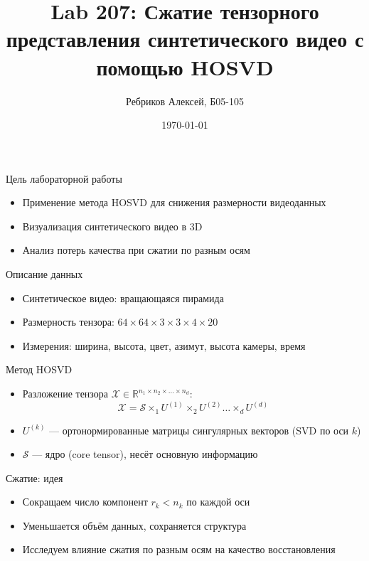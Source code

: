 \documentclass{beamer}
\title{Lab 207: Сжатие тензорного представления синтетического видео с помощью HOSVD}
\author{Ребриков Алексей, Б05-105}
\date{\today}
\begin{document}
\frame{\titlepage}

\begin{frame}{Цель лабораторной работы}
\begin{itemize}
  \item Применение метода HOSVD для снижения размерности видеоданных
  \item Визуализация синтетического видео в 3D
  \item Анализ потерь качества при сжатии по разным осям
\end{itemize}
\end{frame}

\begin{frame}{Описание данных}
\begin{itemize}
  \item Синтетическое видео: вращающаяся пирамида
  \item Размерность тензора: $64 \times 64 \times 3 \times 3 \times 4 \times 20$
  \item Измерения: ширина, высота, цвет, азимут, высота камеры, время
\end{itemize}
\end{frame}

\begin{frame}{Метод HOSVD}
\begin{itemize}
  \item Разложение тензора $\mathcal{X} \in \mathbb{R}^{n_1 \times n_2 \times \dots \times n_d}$:
  \begin{equation*}
    \mathcal{X} = \mathcal{S} \times_1 U^{(1)} \times_2 U^{(2)} \dots \times_d U^{(d)}
  \end{equation*}
  \item $U^{(k)}$ — ортонормированные матрицы сингулярных векторов (SVD по оси $k$)
  \item $\mathcal{S}$ — ядро (core tensor), несёт основную информацию
\end{itemize}
\end{frame}

\begin{frame}{Сжатие: идея}
\begin{itemize}
  \item Сокращаем число компонент $r_k < n_k$ по каждой оси
  \item Уменьшается объём данных, сохраняется структура
  \item Исследуем влияние сжатия по разным осям на качество восстановления
\end{itemize}
\end{frame}
\end{document}
